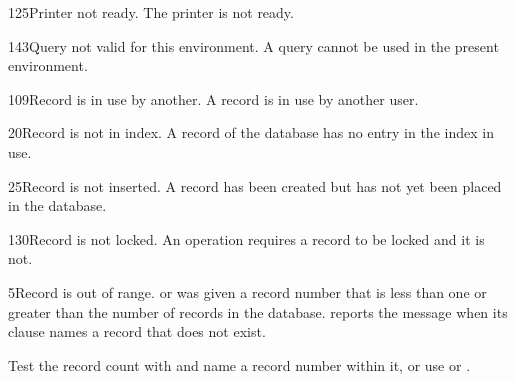 \begin{XbaseMessageEntry}{125}{Printer not ready.}
The printer is not ready.
\end{XbaseMessageEntry}

\begin{XbaseMessageEntry}{143}{Query not valid for this environment.}
A query cannot be used in the present environment.
\end{XbaseMessageEntry}

\begin{XbaseMessageEntry}{109}{Record is in use by another.}
A record is in use by another user.
\end{XbaseMessageEntry}

\begin{XbaseMessageEntry}{20}{Record is not in index.}
A record of the database has no entry in the index in use.
\end{XbaseMessageEntry}

\begin{XbaseMessageEntry}{25}{Record is not inserted.}
A record has been created but has not yet been placed in the database.
\end{XbaseMessageEntry}

\begin{XbaseMessageEntry}{130}{Record is not locked.}
An operation requires a record to be locked and it is not.
\end{XbaseMessageEntry}

\begin{XbaseMessageEntry}{5}{Record is out of range.}
 or  was given a record number that is less than one or greater than the number of records in the database.  reports the message when its  clause names a record that does not exist.

Test the record count with  and name a record number within it, or use  or .
\end{XbaseMessageEntry}


